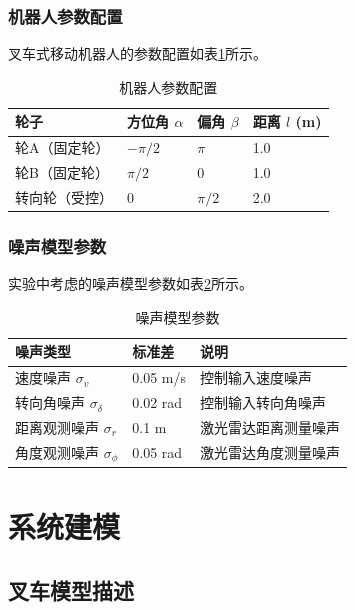 \documentclass[12pt,a4paper]{report}
\begin{document}
\subsection{机器人参数配置}

叉车式移动机器人的参数配置如表\ref{tab:robot_params}所示。

\begin{table}[H]
\centering
\caption{机器人参数配置}
\label{tab:robot_params}
\begin{tabular}{llll}
\toprule
\textbf{轮子} & \textbf{方位角 $\alpha$} & \textbf{偏角 $\beta$} & \textbf{距离 $l$ (m)} \\
\midrule
轮A（固定轮） & $-\pi/2$ & $\pi$ & 1.0 \\
轮B（固定轮） & $\pi/2$ & 0 & 1.0 \\
转向轮（受控） & 0 & $\pi/2$ & 2.0 \\
\bottomrule
\end{tabular}
\end{table}

\subsection{噪声模型参数}

实验中考虑的噪声模型参数如表\ref{tab:noise_params}所示。

\begin{table}[H]
\centering
\caption{噪声模型参数}
\label{tab:noise_params}
\begin{tabular}{lll}
\toprule
\textbf{噪声类型} & \textbf{标准差} & \textbf{说明} \\
\midrule
速度噪声 $\sigma_v$ & 0.05 m/s & 控制输入速度噪声 \\
转向角噪声 $\sigma_\delta$ & 0.02 rad & 控制输入转向角噪声 \\
距离观测噪声 $\sigma_r$ & 0.1 m & 激光雷达距离测量噪声 \\
角度观测噪声 $\sigma_\phi$ & 0.05 rad & 激光雷达角度测量噪声 \\
\bottomrule
\end{tabular}
\end{table}

\chapter{系统建模}

\section{叉车模型描述}
\end{document}
